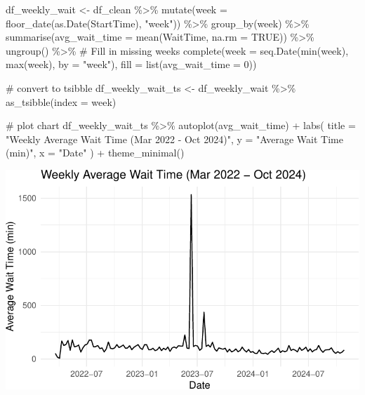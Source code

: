 \documentclass[
  letterpaper,
  DIV=11,
  numbers=noendperiod]{scrartcl}
\newenvironment{Shaded}{\begin{snugshade}}{\end{snugshade}}
\newcommand{\AttributeTok}[1]{\textcolor[rgb]{0.40,0.45,0.13}{#1}}
\newcommand{\CommentTok}[1]{\textcolor[rgb]{0.37,0.37,0.37}{#1}}
\newcommand{\ConstantTok}[1]{\textcolor[rgb]{0.56,0.35,0.01}{#1}}
\newcommand{\DecValTok}[1]{\textcolor[rgb]{0.68,0.00,0.00}{#1}}
\newcommand{\FunctionTok}[1]{\textcolor[rgb]{0.28,0.35,0.67}{#1}}
\newcommand{\NormalTok}[1]{\textcolor[rgb]{0.00,0.23,0.31}{#1}}
\newcommand{\OtherTok}[1]{\textcolor[rgb]{0.00,0.23,0.31}{#1}}
\newcommand{\SpecialCharTok}[1]{\textcolor[rgb]{0.37,0.37,0.37}{#1}}
\newcommand{\StringTok}[1]{\textcolor[rgb]{0.13,0.47,0.30}{#1}}
\begin{document}
\begin{Shaded}
\begin{Highlighting}[]
\NormalTok{df\_weekly\_wait }\OtherTok{\textless{}{-}}\NormalTok{ df\_clean }\SpecialCharTok{\%\textgreater{}\%}
  \FunctionTok{mutate}\NormalTok{(}\AttributeTok{week =} \FunctionTok{floor\_date}\NormalTok{(}\FunctionTok{as.Date}\NormalTok{(StartTime), }\StringTok{"week"}\NormalTok{)) }\SpecialCharTok{\%\textgreater{}\%}
  \FunctionTok{group\_by}\NormalTok{(week) }\SpecialCharTok{\%\textgreater{}\%}
  \FunctionTok{summarise}\NormalTok{(}\AttributeTok{avg\_wait\_time =} \FunctionTok{mean}\NormalTok{(WaitTime, }\AttributeTok{na.rm =} \ConstantTok{TRUE}\NormalTok{)) }\SpecialCharTok{\%\textgreater{}\%}
  \FunctionTok{ungroup}\NormalTok{() }\SpecialCharTok{\%\textgreater{}\%}
  \CommentTok{\# Fill in missing weeks}
  \FunctionTok{complete}\NormalTok{(}\AttributeTok{week =} \FunctionTok{seq.Date}\NormalTok{(}\FunctionTok{min}\NormalTok{(week), }\FunctionTok{max}\NormalTok{(week), }\AttributeTok{by =} \StringTok{"week"}\NormalTok{), }\AttributeTok{fill =} \FunctionTok{list}\NormalTok{(}\AttributeTok{avg\_wait\_time =} \DecValTok{0}\NormalTok{))}

\CommentTok{\# convert to tsibble}
\NormalTok{df\_weekly\_wait\_ts }\OtherTok{\textless{}{-}}\NormalTok{ df\_weekly\_wait }\SpecialCharTok{\%\textgreater{}\%}
  \FunctionTok{as\_tsibble}\NormalTok{(}\AttributeTok{index =}\NormalTok{ week)}

\CommentTok{\# plot chart}
\NormalTok{df\_weekly\_wait\_ts }\SpecialCharTok{\%\textgreater{}\%}
  \FunctionTok{autoplot}\NormalTok{(avg\_wait\_time) }\SpecialCharTok{+}
  \FunctionTok{labs}\NormalTok{(}
    \AttributeTok{title =} \StringTok{"Weekly Average Wait Time (Mar 2022 {-} Oct 2024)"}\NormalTok{, }
    \AttributeTok{y =} \StringTok{"Average Wait Time (min)"}\NormalTok{,}
    \AttributeTok{x =} \StringTok{"Date"}
\NormalTok{  ) }\SpecialCharTok{+}
  \FunctionTok{theme\_minimal}\NormalTok{()}
\end{Highlighting}
\end{Shaded}

\includegraphics{final_proj_group1_files/figure-pdf/unnamed-chunk-3-1.pdf}
\end{document}
